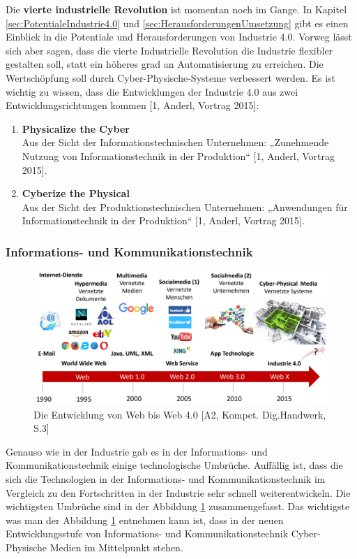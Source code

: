 \newline\newline
Die \textbf{vierte industrielle Revolution} ist momentan noch im Gange. In Kapitel \ref{sec:PotentialeIndustrie4.0} und \ref{sec:HerausforderungenUmsetzung} gibt es einen Einblick in die Potentiale und Herausforderungen von Industrie 4.0. Vorweg lässt sich aber sagen, dass die vierte Industrielle Revolution die Industrie flexibler gestalten soll, statt ein höheres grad an Automatisierung zu erreichen. Die Wertschöpfung soll durch Cyber-Physische-Systeme verbessert werden. Es ist wichtig zu wissen, dass die Entwicklungen der Industrie 4.0 aus zwei Entwicklungsrichtungen kommen [1, Anderl, Vortrag 2015]:
\begin{enumerate}
	\item \textbf{Physicalize the Cyber} \\ Aus der Sicht der Informationstechnischen Unternehmen: „Zunehmende Nutzung von Informationstechnik in der Produktion“ [1, Anderl, Vortrag 2015].
	\item \textbf{Cyberize the Physical} \\ Aus der Sicht der Produktionstechnischen Unternehmen: „Anwendungen für Informationstechnik in der Produktion“ [1, Anderl, Vortrag 2015].
\end{enumerate}

\subsubsection{Informations- und Kommunikationstechnik}\label{sec:WebRevolution}
\begin{figure}[h]
	\centering
	\includegraphics[width=1\linewidth]{Bilder/A2_EntwicklungWeb0-4}
	\caption{Die Entwicklung von Web bis Web 4.0 [A2, Kompet. Dig.Handwerk, S.3]}
	\label{fig:WebRevolutionBild}
\end{figure}
\noindent Genauso wie in der Industrie gab es in der Informations- und Kommunikationstechnik einige technologische Umbrüche. Auffällig ist, dass die sich die Technologien in der Informations- und Kommunikationstechnik im Vergleich zu den Fortschritten in der Industrie sehr schnell weiterentwickeln. Die wichtigsten Umbrüche sind in der Abbildung \ref{fig:WebRevolutionBild} zusammengefasst.
\newline\newline
Das wichtigste was man der Abbildung \ref{fig:WebRevolutionBild} entnehmen kann ist, dass in der neuen Entwicklungsstufe von Informations- und Kommunikationstechnik Cyber-Physische Medien im Mittelpunkt stehen.

